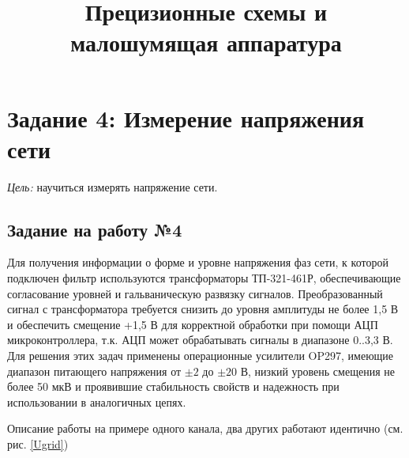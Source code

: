 \title{Прецизионные схемы и малошумящая аппаратура}
\author{}


\section{Задание 4: Измерение напряжения сети}

{\it Цель:} научиться измерять напряжение сети.
 
\subsection{Задание на работу №4}

Для получения информации о форме и уровне напряжения фаз сети, к которой подключен фильтр используются трансформаторы ТП-321-461Р, 
обеспечивающие согласование уровней и гальваническую развязку сигналов. 
Преобразованный сигнал с трансформатора требуется снизить до уровня амплитуды не более 1,5 В и обеспечить смещение +1,5 В 
для корректной обработки при помощи АЦП микроконтроллера, т.к. АЦП может обрабатывать сигналы в диапазоне 0..3,3 В. 
Для решения этих задач применены операционные усилители OP297, имеющие диапазон питающего напряжения от $\pm2$ до $\pm20$ В, 
низкий уровень смещения не более 50 мкВ и проявившие стабильность свойств и надежность при использовании в аналогичных цепях. 

Описание работы на примере одного канала, два других работают идентично (см. рис. \ref{Ugrid})

